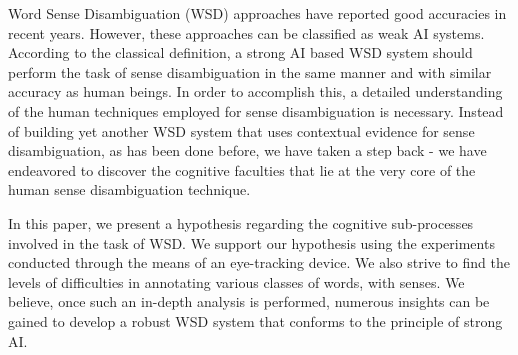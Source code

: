 Word Sense Disambiguation (WSD) approaches have reported good accuracies in recent years. However, these approaches can be classified as weak AI systems.
 According to the classical definition, a strong AI based WSD system should
 perform the task of sense disambiguation in the same manner and with similar
 accuracy as human beings. In order to accomplish this, a detailed understanding
 of the human techniques employed for sense disambiguation is necessary. Instead
 of building yet another WSD system that uses contextual evidence for sense
 disambiguation, as has been done before, we have taken a step back - we have
 endeavored to discover the cognitive faculties that lie at the very core of the
 human sense disambiguation technique.
 
 In this paper, we present a hypothesis regarding the cognitive sub-processes
 involved in the task of WSD. We support our hypothesis using the experiments
 conducted through the means of an eye-tracking device. We also strive to find
 the levels of difficulties in annotating various classes of words, with senses.
 We believe, once such an in-depth analysis is performed, numerous insights can
 be gained to develop a robust WSD system that conforms to the principle of
 strong AI.

